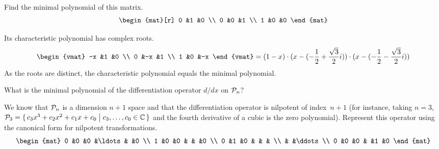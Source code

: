 \begin{exercises}
\begin{answer}
    \end{answer}
   \item 
     Find the minimal polynomial of this matrix.
     \begin{equation*}
        \begin{mat}[r]
           0  &1  &0  \\
           0  &0  &1  \\
           1  &0  &0
        \end{mat}
     \end{equation*}
     \begin{answer}
       Its characteristic polynomial has complex roots.
       \begin{equation*}
          \begin{vmat}
                   -x  &1  &0  \\
                    0  &-x &1  \\
                    1  &0  &-x
          \end{vmat}
          =(1-x)\cdot (x-(-\frac{1}{2}+\frac{\sqrt{3}}{2}i))
                \cdot (x-(-\frac{1}{2}-\frac{\sqrt{3}}{2}i))
       \end{equation*}
       As the roots are distinct, the characteristic polynomial equals the
       minimal polynomial. 
     \end{answer}
  \recommended \item 
     What is the minimal polynomial of the differentiation
     operator $d/dx$ on \( \mathcal{P}_n \)?
     \begin{answer}
       We know that $\mathcal{P}_n$ is a dimension $n+1$ space and that
       the differentiation operator is
       nilpotent of index~$n+1$ (for instance, taking $n=3$, 
       $\mathcal{P}_3=\mbox{$\{\,c_3x^3+c_2x^2+c_1x+c_0\bigm| c_3,\ldots,c_0\in\mathbb{C}\,\}$}$
       and the fourth derivative of a cubic is the zero polynomial).  
       Represent this operator using the canonical 
       form for nilpotent transformations.
       \begin{equation*}
         \begin{mat}
           0  &0  &0  &\ldots &  &0  \\
           1  &0  &0  &       &  &0  \\
           0  &1  &0  &       &  &   \\
              &   &\ddots            \\
           0  &0  &0  &       &1 &0 
         \end{mat}
       \end{equation*}

\end{answer}
\end{exercises}
